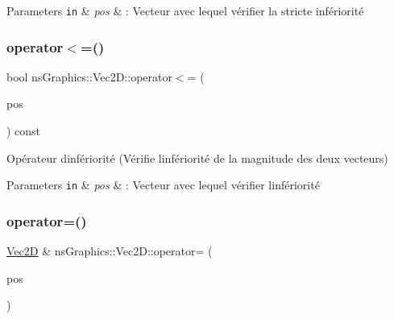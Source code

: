 \begin{DoxyParams}[1]{Parameters}
\mbox{\tt in}  & {\em pos} & \+: Vecteur avec lequel vérifier la stricte infériorité \\
\hline
\end{DoxyParams}
\mbox{\label{classns_graphics_1_1_vec2_d_afd5e0e3ba77ef971f8d022d69a4a2647}} 
\subsubsection{\texorpdfstring{operator$<$=()}{operator<=()}}
{\footnotesize\ttfamily bool ns\+Graphics\+::\+Vec2\+D\+::operator$<$= (\begin{DoxyParamCaption}\item[{const \hyperlink{classns_graphics_1_1_vec2_d}{Vec2D} \&}]{pos }\end{DoxyParamCaption}) const}



Opérateur d\textquotesingle{}infériorité (Vérifie l\textquotesingle{}infériorité de la magnitude des deux vecteurs) 


\begin{DoxyParams}[1]{Parameters}
\mbox{\tt in}  & {\em pos} & \+: Vecteur avec lequel vérifier l\textquotesingle{}infériorité \\
\hline
\end{DoxyParams}
\mbox{\label{classns_graphics_1_1_vec2_d_a041926192c1d2c579b12dcf1eb1725d5}} 
\subsubsection{\texorpdfstring{operator=()}{operator=()}}
{\footnotesize\ttfamily \hyperlink{classns_graphics_1_1_vec2_d}{Vec2D} \& ns\+Graphics\+::\+Vec2\+D\+::operator= (\begin{DoxyParamCaption}\item[{const \hyperlink{classns_graphics_1_1_vec2_d}{Vec2D} \&}]{pos }\end{DoxyParamCaption})}



